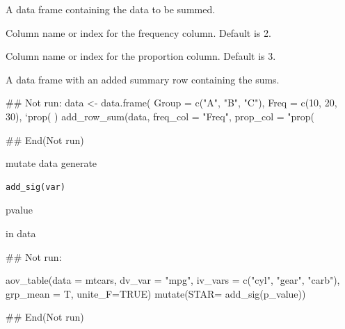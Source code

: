 \documentclass[a4paper]{book}
\begin{document}
%
\begin{Arguments}
\begin{ldescription}
\item[\code{df}] A data frame containing the data to be summed.

\item[\code{freq\_col}] Column name or index for the frequency column. Default is 2.

\item[\code{prop\_col}] Column name or index for the proportion column. Default is 3.
\end{ldescription}
\end{Arguments}
%
\begin{Value}
A data frame with an added summary row containing the sums.
\end{Value}
%
\begin{Examples}
\begin{ExampleCode}
## Not run: 
data <- data.frame(
  Group = c("A", "B", "C"),
  Freq = c(10, 20, 30),
  `prop(%
)
add_row_sum(data, freq_col = "Freq", prop_col = "prop(%

## End(Not run)
\end{ExampleCode}
\end{Examples}
%
\begin{Description}
mutate data generate
\end{Description}
%
\begin{Usage}
\begin{verbatim}
add_sig(var)
\end{verbatim}
\end{Usage}
%
\begin{Arguments}
\begin{ldescription}
\item[\code{p.value}] pvalue
\end{ldescription}
\end{Arguments}
%
\begin{Value}
in data
\end{Value}
%
\begin{Examples}
\begin{ExampleCode}

## Not run: 

aov_table(data = mtcars, dv_var = "mpg",
iv_vars = c("cyl", "gear", "carb"), grp_mean = T,
unite_F=TRUE) %
 mutate(STAR= add_sig(p_value))


## End(Not run)
\end{ExampleCode}
\end{Examples}
\end{document}
